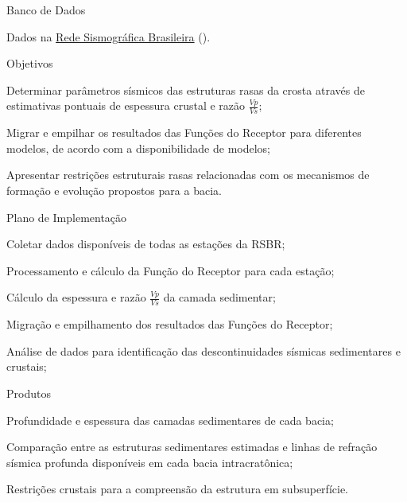 \documentclass[10pt,a4paper,oneside]{book}
\begin{document}
\begin{fancyenum}{\faDatabase}{Banco de Dados}
	\item Dados na \href{http://rsbr.on.br/}{Rede Sismográfica Brasileira} (\faUnlock).
\end{fancyenum}

\begin{fancyenum}{\faFutbol}{Objetivos}
	\item Determinar parâmetros sísmicos das estruturas rasas da crosta através de estimativas pontuais de espessura crustal e razão $\frac{Vp}{Vs}$;
	\item Migrar e empilhar os resultados das Funções do Receptor para diferentes modelos, de acordo com a disponibilidade de modelos;
	\item Apresentar restrições estruturais rasas relacionadas com os mecanismos de formação e evolução propostos para a bacia.
\end{fancyenum}

\begin{fancyenum}{\faBrain}{Plano de Implementação}
	\item Coletar dados disponíveis de todas as estações da RSBR;
	\item Processamento e cálculo da Função do Receptor para cada estação;
	\item Cálculo da espessura e razão $\frac{Vp}{Vs}$ da camada sedimentar;
	\item Migração e empilhamento dos resultados das Funções do Receptor;
	\item Análise de dados para identificação das descontinuidades sísmicas sedimentares e crustais;
\end{fancyenum}

\begin{fancyenum}{\faShoppingCart}{Produtos}
	\item Profundidade e espessura das camadas sedimentares de cada bacia;
	\item Comparação entre as estruturas sedimentares estimadas e linhas de refração sísmica profunda disponíveis em cada bacia intracratônica;	
	\item Restrições crustais para a compreensão da estrutura em subsuperfície.
\end{fancyenum}
\end{document}
